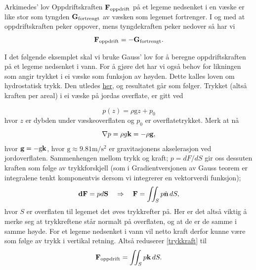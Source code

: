 \begin{oppsum}{Arkimedes' lov}
Oppdriftskraften $\mathbf{F}_\textrm{oppdrift}$ på et legeme nedsenket i en væske er like stor som tyngden $\mathbf{G}_\textrm{fortrengt}$ av væsken som legemet fortrenger. I og med at oppdriftskraften peker oppover, mens tyngdekraften peker nedover så har vi 
\begin{equation}
    \label{arkimedes}
    \mathbf{F}_\textrm{oppdrift}=-\mathbf{G}_\textrm{fortrengt}.
\end{equation}
\end{oppsum}
I det følgende eksemplet skal vi bruke Gauss' lov for å beregne oppdriftskraften på et legeme nedsenket i vann. For å gjøre det har vi også behov for likningen som angir trykket i ei væske som funksjon av høyden. Dette kalles loven om hydrostatisk trykk. Den utledes \href{https://www.youtube.com/watch?v=RpJu9hDTsGU&list=PLBSPq-MdQqruVxoeYU6tAZ9t-kDUXXhoE&index=5}{her}, og resultatet går som følger. Trykket (altså kraften per areal) i ei væske på jordas overflate, er gitt ved

\begin{equation}
    p(z)=\rho\textrm{g}z+p_0
\end{equation}
hvor $z$ er dybden under væskeoverflaten og $p_0$ er overflatetrykket. Merk at nå  
\begin{equation}
\label{gradp}
    \nabla p = \rho g\mathbf{k} = -\rho\mathbf{g},
\end{equation}
hvor $\mathbf{g}=-\textrm{g}\mathbf{k}$, hvor $\textrm{g}\approx 9.81\textrm{m}/\textrm{s}^2$ er gravitasjonens akselerasjon ved jordoverflaten. Sammenhengen mellom trykk og kraft; $p=dF/dS$ gir oss dessuten kraften som følge av trykkforskjell (som i Gradientversjonen av Gauss teorem er integralene tenkt komponentvis dersom vi integrerer en vektorverdi funksjon);
\begin{align}
\label{trykkraft}
   \mathbf{dF}= p d\mathbf{S} \quad\Rightarrow \quad \mathbf{F}=\iint_S p\hat{\mathbf{n}} \,dS,
\end{align}
hvor $S$ er overflaten til legemet det øves trykkrefter på. Her er det altså viktig å merke seg at trykkreftene står normalt på overflaten, og at de er de samme i samme høyde. For et legeme nedsenket i vann vil netto kraft derfor kunne være som følge av trykk i vertikal retning. Altså reduserer \eqref{trykkraft} til
\begin{align}
\label{trykkraft2}
\mathbf{F}_\textrm{oppdrift}=\iint_S p\mathbf{k}\, dS.
\end{align}

